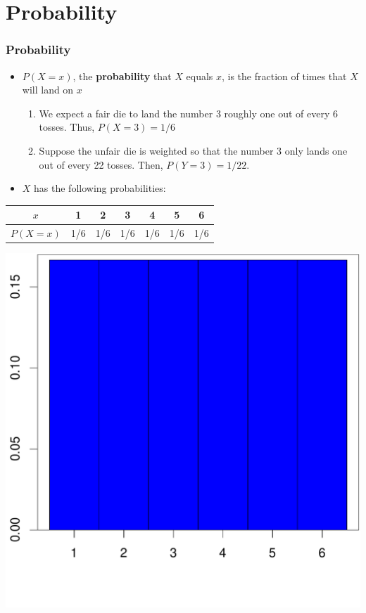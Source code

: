 \documentclass[handout]{beamer}\usepackage[]{graphicx}\usepackage[]{color}
\newenvironment{knitrout}{}{} %
\providecommand{\q}{$\quad$ \newline}
\numberwithin{equation}{section}
\begin{document}
\section{Probability}

\begin{frame}
\frametitle{Probability}
\begin{itemize}
\pause \item $P(X = x)$, the {\bf probability} that $X$ equals $x$, is the fraction of times that $X$ will land on $x$
\begin{enumerate}[1. ]
\pause \item We expect a fair die to land the number 3 roughly one out of every 6 tosses. Thus, $P(X = 3) = 1/6$
\pause \item Suppose the unfair die is weighted so that the number 3 only lands one out of every 22 tosses. Then, $P(Y = 3) = 1/22$. 
\end{enumerate}
\end{itemize}
\end{frame}


\begin{frame}

\begin{itemize}
\item $X$ has the following probabilities: \q 
\end{itemize}
\begin{tabular}{ccccccc}
$x$ & 1 & 2 & 3 & 4 & 5 & 6 \\ \hline
$P(X = x)$ & 1/6 & 1/6 & 1/6 & 1/6 & 1/6 & 1/6 
\end{tabular} 

\begin{center}
\begin{knitrout}
\color{fgcolor}
\includegraphics[width=.6\textwidth,height=.6\textheight]{figure/unnamed-chunk-2-1} 

\end{knitrout}
\end{center}


\end{frame}
\end{document}
